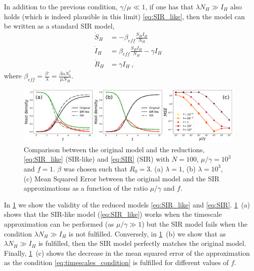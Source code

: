 In addition to the previous condition, $\gamma/\mu\ll1$, if one has that
$\lambda N_H \gg I_H$ also holds (which is indeed plausible in this limit)
\cref{eq:SIR_like}, then the model can be written as a standard SIR model,
\begin{equation}\label{eq:SIR}
    \begin{aligned}
        \dot{S}_H & =-\beta_{eff}\frac{S_HI_H}{N_H}            \\
        \dot{I}_H & =\beta_{eff}\frac{S_HI_H}{N_H}- \gamma I_H \\
        \dot{R}_H & =\gamma I_H \ ,
    \end{aligned}
\end{equation}
where $\displaystyle\beta_{eff}=\frac{\beta'}{\lambda}=\frac{\beta\alpha
        N_v^*}{\mu N_H}$.

\begin{figure}[H]
    \centering
    \includegraphics[width=\textwidth]{Figures/SIR_like_approx_comp.pdf}
    \caption[Comparison between the original model and the
    reductions]{Comparison between the original model and the reductions,
    \cref{eq:SIR_like} (SIR-like) and \cref{eq:SIR} (SIR) with $N=100$,
    $\mu/\gamma=10^{3}$ and $f=1$. $\beta$ was chosen such that $R_0=3$.  (a)
    $\lambda=1$, (b) $\lambda=10^3$, (c) Mean Squared Error between the
    original
    model and the SIR approximations as a function of the ratio $\mu/\gamma$
    and
    $f$.}
    \label{fig:SIR_like_approx}
\end{figure}

In \cref{fig:SIR_like_approx} we show the validity of the reduced models
\cref{eq:SIR_like} and \cref{eq:SIR}.
\cref{fig:SIR_like_approx}~\textcolor{ref_color}{(a)} shows that
the SIR-like model (\cref{eq:SIR_like}) works when the timescale approximation
can be performed (as $\mu/\gamma\gg1$) but the SIR model fails when the
condition $\lambda N_H \gg I_H$ is not fulfilled. Conversely, in
\cref{fig:SIR_like_approx}~\textcolor{ref_color}{(b)} we show that as $\lambda
    N_H \gg I_H$ is
fulfilled, then the SIR model perfectly matches the original model. Finally,
\cref{fig:SIR_like_approx}~\textcolor{ref_color}{(c)} shows the decrease in the
mean squared error of
the approximation as the condition \cref{eq:timescales_condition} is fulfilled
for different values of $f$.

